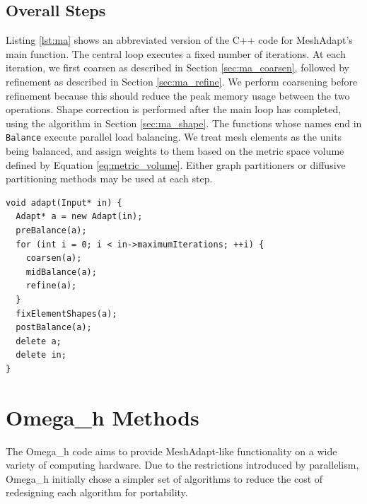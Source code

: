 \subsection{Overall Steps}

Listing \ref{lst:ma} shows an abbreviated version of the C++
code for MeshAdapt's main function.
The central loop executes a fixed number of iterations.
At each iteration, we first coarsen as described
in Section \ref{sec:ma_coarsen}, followed by refinement
as described in Section \ref{sec:ma_refine}.
We perform coarsening before refinement because this
should reduce the peak memory usage between the two
operations.
Shape correction is performed after the main loop
has completed, using the algorithm in Section \ref{sec:ma_shape}.
The functions whose names end in \texttt{Balance} execute
parallel load balancing.
We treat mesh elements as the units being balanced,
and assign weights to them based on the metric space
volume defined by Equation \ref{eq:metric_volume}.
Either graph partitioners \cite{devine2002zoltan} or
diffusive partitioning methods \cite{SmithParma2015}
may be used at each step.

\begin{lstlisting}[float,style=dan-style,caption=MeshAdapt main function,label=lst:ma]
void adapt(Input* in) {
  Adapt* a = new Adapt(in);
  preBalance(a);
  for (int i = 0; i < in->maximumIterations; ++i) {
    coarsen(a);
    midBalance(a);
    refine(a);
  }
  fixElementShapes(a);
  postBalance(a);
  delete a;
  delete in;
}
\end{lstlisting}

\section{Omega\_h Methods}
\label{sec:omega_h-adapt}

The Omega\_h code aims to provide MeshAdapt-like functionality
on a wide variety of computing hardware.
Due to the restrictions introduced by parallelism, Omega\_h
initially chose a simpler set of algorithms to reduce the
cost of redesigning each algorithm for portability.

